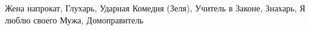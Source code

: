  
 
 
 
 

Жена напрокат, Глухарь, Ударная Комедия (Зеля), Учитель в Законе,
Знахарь, Я люблю своего Мужа, Домоправитель
